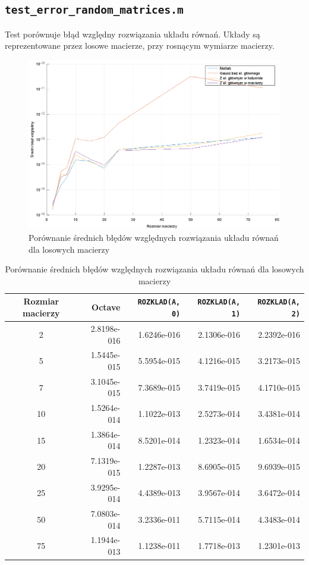 \documentclass{article}
\begin{document}
\subsection{\texttt{test\_error\_random\_matrices.m}}
Test porównuje błąd względny rozwiązania układu równań. Układy są reprezentowane przez losowe macierze, przy rosnącym wymiarze macierzy.

\begin{figure}[H]
    \centering
    \includegraphics[scale=1]{test_error_random_matrices}
    \caption{Porównanie średnich błędów względnych rozwiązania układu równań dla losowych macierzy}
\end{figure}

\begin{table}[H]
    \centering
    \begin{tabular}{ |c|r|r|r|r| }
        \hline
        Rozmiar macierzy & Octave & \verb|ROZKLAD(A, 0)| & \verb|ROZKLAD(A, 1)| & \verb|ROZKLAD(A, 2)| \\
        \hline
         2 & 2.8198e-016 & 1.6246e-016 & 2.1306e-016 & 2.2392e-016 \\
         5 & 1.5445e-015 & 5.5954e-015 & 4.1216e-015 & 3.2173e-015 \\
         7 & 3.1045e-015 & 7.3689e-015 & 3.7419e-015 & 4.1710e-015 \\
        10 & 1.5264e-014 & 1.1022e-013 & 2.5273e-014 & 3.4381e-014 \\
        15 & 1.3864e-014 & 8.5201e-014 & 1.2323e-014 & 1.6534e-014 \\
        20 & 7.1319e-015 & 1.2287e-013 & 8.6905e-015 & 9.6939e-015 \\
        25 & 3.9295e-014 & 4.4389e-013 & 3.9567e-014 & 3.6472e-014 \\
        50 & 7.0803e-014 & 3.2336e-011 & 5.7115e-014 & 4.3483e-014 \\
        75 & 1.1944e-013 & 1.1238e-011 & 1.7718e-013 & 1.2301e-013 \\
        \hline
    \end{tabular}
    \caption{Porównanie średnich błędów względnych rozwiązania układu równań dla losowych macierzy}
\end{table}
\end{document}
